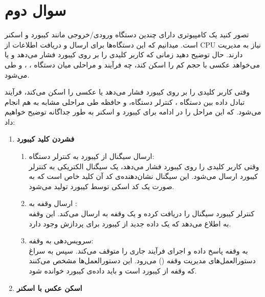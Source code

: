 \section{سوال دوم}

تصور کنید یک کامپیوتری دارای چندین دستگاه ورودی/خروجی  مانند کیبورد و اسکنر است. میدانیم که این دستگاه‌ها برای ارسال و دریافت اطلاعات از CPU نیاز به مدیریت دارند. حال توضیح دهید زمانی که کاربر کلیدی را بر روی کیبورد فشار می‌دهد و یا می‌خواهد عکسی با حجم کم را اسکن کند، چه فرآیند و مراحلی میان دستگاه ، ،  و  طی می‌شود.


\begin{qsolve}[]
	وقتی کاربر کلیدی را بر روی کیبورد فشار می‌دهد یا عکسی را اسکن می‌کند، فرآیند تبادل داده بین دستگاه ، کنترلر دستگاه،  و حافظه طی مراحلی مشابه به هم انجام می‌شود. که این مراحل را در ادامه برای کیبورد و اسکنر به طور جداگانه توضیح خواهیم داد:
	
	\begin{enumerate}
		\item 
		\textbf{فشردن کلید کیبورد}
		
		\begin{enumerate}
			\item
			ارسال سیگنال از کیبورد به کنترلر دستگاه:\\
			وقتی کاربر کلیدی را روی کیبورد فشار می‌دهد، یک سیگنال الکتریکی به کنترلر کیبورد ارسال می‌شود. این سیگنال نشان‌دهنده‌ی کد آن کلید خاص است که به صورت یک کد اسکی توسط کیبورد تولید می‌شود.
			
			\item 
			ارسال وقفه به :\\
			کنترلر کیبورد سیگنال را دریافت کرده و یک وقفه به  ارسال می‌کند. این وقفه به  اطلاع می‌دهد که یک داده جدید از کیبورد برای پردازش وجود دارد.
			
			\item 
			سرویس‌دهی به وقفه:\\
			به وقفه پاسخ داده و اجرای فرآیند جاری را متوقف می‌کند. سپس  به سراغ دستورالعمل‌های مدیریت وقفه () می‌رود. این دستورالعمل‌ها مشخص می‌کنند که وقفه از کیبورد است و باید داده‌ی کیبورد خوانده شود.
		\end{enumerate}
		
		
		
		\item 
		\textbf{اسکن عکس با اسکنر}
	\end{enumerate}
\end{qsolve}